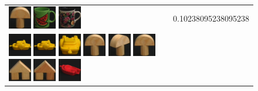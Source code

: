 \begin{figure}[tbp]
\begin{center}
\begin{tabular}{m{11cm} | m{3cm} |}
\includegraphics[width=1cm]{coil/beeld-1.eps}
\includegraphics[width=1cm]{coil/beeld-30.eps}
\includegraphics[width=1cm]{coil/beeld-60.eps}
& {\scriptsize 0.10238095238095238}
\\
\includegraphics[width=1cm]{coil/beeld-12.eps}
\includegraphics[width=1cm]{coil/beeld-12.eps}
\includegraphics[width=1cm]{coil/beeld-14.eps}
\includegraphics[width=1cm]{coil/beeld-0.eps}
\includegraphics[width=1cm]{coil/beeld-3.eps}
\includegraphics[width=1cm]{coil/beeld-0.eps}
\includegraphics[width=1cm]{coil/beeld-42.eps}
\includegraphics[width=1cm]{coil/beeld-43.eps}
\includegraphics[width=1cm]{coil/beeld-22.eps}

\end{tabular}
\end{center}
\end{figure}
